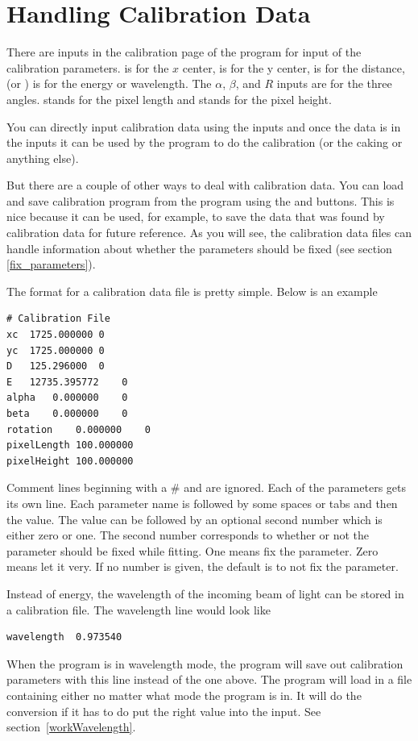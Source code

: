 \section{Handling Calibration Data}

There are inputs in the calibration page of the
program for input of the calibration parameters.
 is for the $x$ center,  is
for the y center,  is for the distance,
 (or \gui{$\lambda$:}) is for the energy
or wavelength. The $\alpha$, $\beta$, and
$R$ inputs are for the three angles. 
 stands for the pixel length
and  stands for the pixel height.

You can directly input calibration data using 
the inputs and once the data is in the inputs
it can be used by the program to do the calibration
(or the caking or anything else).

But there are a couple of other ways to deal
with calibration data.
You can load and save calibration program
from the program using the 
and  buttons. This is nice
because it can be used, for example, to save 
the data that was found by calibration data
for future reference. As you will see, the 
calibration data files can handle information
about whether the parameters should be fixed
(see section \ref{fix_parameters}).

The format for a calibration data file is 
pretty simple. Below is  an example
\begin{lstlisting}[caption={Calibration Parameters}]
# Calibration File
xc	1725.000000	0
yc	1725.000000	0
D	125.296000	0
E	12735.395772	0
alpha	0.000000	0
beta	0.000000	0
rotation	0.000000	0
pixelLength	100.000000
pixelHeight	100.000000
\end{lstlisting}
Comment lines beginning with
a \# and are ignored. Each of the parameters
gets its own line. Each parameter name is 
followed by some spaces or tabs and then the
value. The value can be followed by an optional
second number which is either zero or one.
The second number corresponds to whether or
not the parameter should be fixed while
fitting. One means fix the parameter. Zero means
let it very. If no number is given, the default
is to not fix the parameter.

Instead of energy, the wavelength of the incoming
beam of light can be stored in a calibration file.
The wavelength line would look like 
\begin{lstlisting}[caption={Wavelength Parameter}]
wavelength	0.973540
\end{lstlisting}
When the program is in wavelength mode, the program
will save out calibration parameters with this line
instead of the one above. The program will load in a 
file containing either no matter what mode the program 
is in. It will do the conversion if it has to do put 
the right value into the input. See 
section~\ref{workWavelength}.


